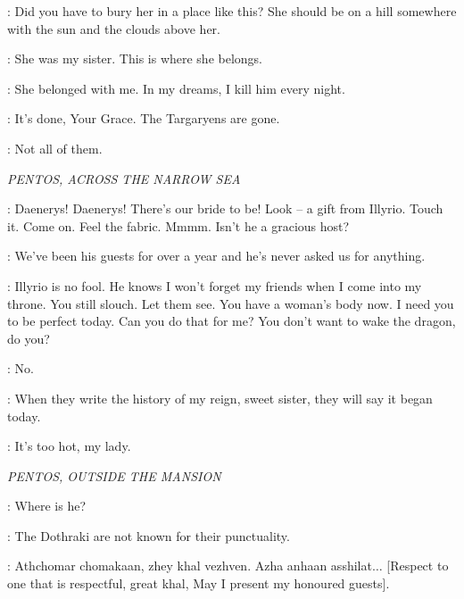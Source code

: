 \ROBERT: Did you have to bury her in a place like this? She should be on a hill somewhere with the sun and the clouds above her. 

\NED: She was my sister. This is where she belongs. 

\ROBERT: She belonged with me. In my dreams, I kill him every night. 

\NED: It's done, Your Grace. The Targaryens are gone. 

\ROBERT: Not all of them. 


\scene

\textit{PENTOS, ACROSS THE NARROW SEA} 


\VISERYS: Daenerys! Daenerys! There's our bride to be! Look -- a gift from Illyrio. Touch it. Come on. Feel the fabric. Mmmm. Isn't he a gracious host? 

\DAENERYS: We've been his guests for over a year and he's never asked us for anything. 

\VISERYS: Illyrio is no fool. He knows I won't forget my friends when I come into my throne. You still slouch. Let them see.  You have a woman's body now.  I need you to be perfect today. Can you do that for me? You don't want to wake the dragon, do you? 

\DAENERYS: No. 


\VISERYS: When they write the history of my reign, sweet sister, they will say it began today. 


\MAID: It's too hot, my lady. 


\scene

\textit{PENTOS, OUTSIDE THE MANSION} 


\VISERYS: Where is he? 

\ILLYRIO: The Dothraki are not known for their punctuality. 


\ILLYRIO: Athchomar chomakaan, zhey khal vezhven. Azha anhaan asshilat$\ldots$ [Respect to one that is respectful, great khal, May I present my honoured guests]. 

